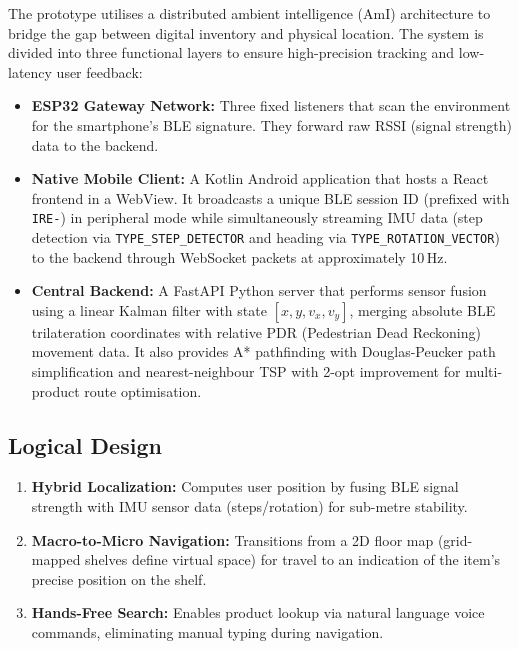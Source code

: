 \documentclass[12pt,a4paper]{article}
\begin{document}
The prototype utilises a distributed ambient intelligence (AmI) architecture to
bridge the gap between digital inventory and physical location. The system is
divided into three functional layers to ensure high-precision tracking and
low-latency user feedback:

\begin{itemize}
    \item \textbf{ESP32 Gateway Network:} Three fixed listeners that scan the
    environment for the smartphone's BLE signature. They forward raw RSSI
    (signal strength) data to the backend.

    \item \textbf{Native Mobile Client:} A Kotlin Android application that
    hosts a React frontend in a WebView. It broadcasts a unique BLE session
    ID (prefixed with \texttt{IRE-}) in peripheral mode while simultaneously
    streaming IMU data (step detection via \texttt{TYPE\_STEP\_DETECTOR} and
    heading via \texttt{TYPE\_ROTATION\_VECTOR}) to the backend through
    WebSocket packets at approximately 10\,Hz.

    \item \textbf{Central Backend:} A FastAPI Python server that performs
    sensor fusion using a linear Kalman filter with state
    $[x, y, v_x, v_y]$, merging absolute BLE trilateration coordinates
    with relative PDR (Pedestrian Dead Reckoning) movement data. It also
    provides A* pathfinding with Douglas-Peucker path simplification and
    nearest-neighbour TSP with 2-opt improvement for multi-product route
    optimisation.
\end{itemize}

\subsection{Logical Design}

\begin{enumerate}
    \item \textbf{Hybrid Localization:} Computes user position by fusing BLE
    signal strength with IMU sensor data (steps/rotation) for sub-metre
    stability.

    \item \textbf{Macro-to-Micro Navigation:} Transitions from a 2D floor map
    (grid-mapped shelves define virtual space) for travel to an indication of
    the item's precise position on the shelf.

    \item \textbf{Hands-Free Search:} Enables product lookup via natural
    language voice commands, eliminating manual typing during navigation.
\end{enumerate}
\end{document}
